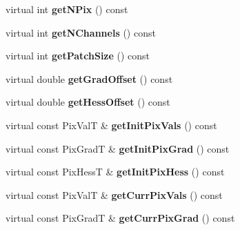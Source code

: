 \begin{DoxyCompactItemize}
\item 
\hypertarget{classImageBase_a2151ca10c29dfe674c5503cd1f7352c6}{virtual int {\bfseries get\-N\-Pix} () const }\label{classImageBase_a2151ca10c29dfe674c5503cd1f7352c6}

\item 
\hypertarget{classImageBase_a5d28f1bd86db90f9d1a056545828f444}{virtual int {\bfseries get\-N\-Channels} () const }\label{classImageBase_a5d28f1bd86db90f9d1a056545828f444}

\item 
\hypertarget{classImageBase_a3e4aac727c581d0a2745641669864df1}{virtual int {\bfseries get\-Patch\-Size} () const }\label{classImageBase_a3e4aac727c581d0a2745641669864df1}

\item 
\hypertarget{classImageBase_a152c661dd701949ab326dfff6caf5fba}{virtual double {\bfseries get\-Grad\-Offset} () const }\label{classImageBase_a152c661dd701949ab326dfff6caf5fba}

\item 
\hypertarget{classImageBase_a23a89704145102741c43eaeef9dba171}{virtual double {\bfseries get\-Hess\-Offset} () const }\label{classImageBase_a23a89704145102741c43eaeef9dba171}

\item 
\hypertarget{classImageBase_a6f7d67dad333f72a55f49c4aa63ef1c0}{virtual const Pix\-Val\-T \& {\bfseries get\-Init\-Pix\-Vals} () const }\label{classImageBase_a6f7d67dad333f72a55f49c4aa63ef1c0}

\item 
\hypertarget{classImageBase_a99a58357f0eaa15c70e9c0ee21da9d05}{virtual const Pix\-Grad\-T \& {\bfseries get\-Init\-Pix\-Grad} () const }\label{classImageBase_a99a58357f0eaa15c70e9c0ee21da9d05}

\item 
\hypertarget{classImageBase_a2b0e6211578a63205e936412dfee1fb6}{virtual const Pix\-Hess\-T \& {\bfseries get\-Init\-Pix\-Hess} () const }\label{classImageBase_a2b0e6211578a63205e936412dfee1fb6}

\item 
\hypertarget{classImageBase_a28ec6b021eb2cbb57386979cbb8dd8f1}{virtual const Pix\-Val\-T \& {\bfseries get\-Curr\-Pix\-Vals} () const }\label{classImageBase_a28ec6b021eb2cbb57386979cbb8dd8f1}

\item 
\hypertarget{classImageBase_a5626c50674100fc7acd0364029ae2827}{virtual const Pix\-Grad\-T \& {\bfseries get\-Curr\-Pix\-Grad} () const }\label{classImageBase_a5626c50674100fc7acd0364029ae2827}


\end{DoxyCompactItemize}
